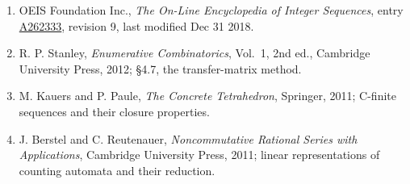\documentclass[11pt]{article}
\theoremstyle{definition}
\begin{document}
\begin{enumerate}

\item OEIS Foundation Inc., \emph{The On-Line Encyclopedia of Integer Sequences}, entry \href{https://oeis.org/A262333}{A262333}, revision 9, last modified Dec 31 2018.

\item R. P. Stanley, \emph{Enumerative Combinatorics}, Vol.~1, 2nd ed., Cambridge University Press, 2012; \S4.7, the transfer-matrix method.

\item M. Kauers and P. Paule, \emph{The Concrete Tetrahedron}, Springer, 2011; C-finite sequences and their closure properties.

\item J. Berstel and C. Reutenauer, \emph{Noncommutative Rational Series with Applications}, Cambridge University Press, 2011; linear representations of counting automata and their reduction.

\end{enumerate}
\end{document}
